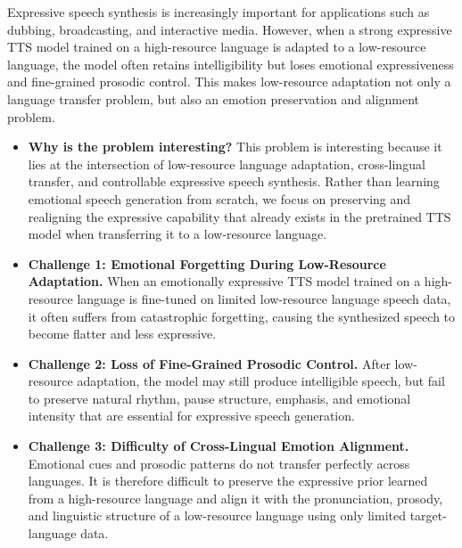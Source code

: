 Expressive speech synthesis is increasingly important for applications such as dubbing, broadcasting, and interactive media. However, when a strong expressive TTS model trained on a high-resource language is adapted to a low-resource language, the model often retains intelligibility but loses emotional expressiveness and fine-grained prosodic control. This makes low-resource adaptation not only a language transfer problem, but also an emotion preservation and alignment problem.

\begin{itemize}
    \item \textbf{Why is the problem interesting?} 
    This problem is interesting because it lies at the intersection of low-resource language adaptation, cross-lingual transfer, and controllable expressive speech synthesis. Rather than learning emotional speech generation from scratch, we focus on preserving and realigning the expressive capability that already exists in the pretrained TTS model when transferring it to a low-resource language.
    
    \item \textbf{Challenge 1: Emotional Forgetting During Low-Resource Adaptation.} When an emotionally expressive TTS model trained on a high-resource language is fine-tuned on limited low-resource language speech data, it often suffers from catastrophic forgetting, causing the synthesized speech to become flatter and less expressive.
    
    \item \textbf{Challenge 2: Loss of Fine-Grained Prosodic Control.} After low-resource adaptation, the model may still produce intelligible speech, but fail to preserve natural rhythm, pause structure, emphasis, and emotional intensity that are essential for expressive speech generation.
    
    \item \textbf{Challenge 3: Difficulty of Cross-Lingual Emotion Alignment.} Emotional cues and prosodic patterns do not transfer perfectly across languages. It is therefore difficult to preserve the expressive prior learned from a high-resource language and align it with the pronunciation, prosody, and linguistic structure of a low-resource language using only limited target-language data.
    

\end{itemize}
